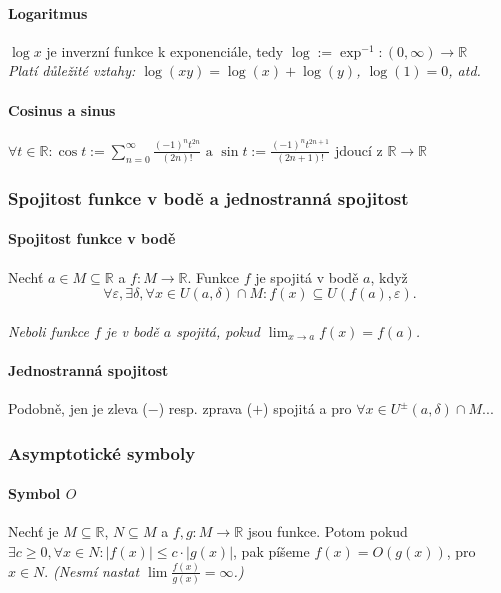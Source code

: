 \documentclass[10pt,a4paper]{article}
\newcommand{\R}{{\mathbb{R}}}
\begin{document}
\paragraph*{Logaritmus} $\log x$ je inverzní funkce k exponenciále, tedy $\log := \exp^{-1}:(0, \infty) \to \R$\\
\textit{Platí důležité vztahy: $\log(xy) = \log(x)+\log(y)$, $\log(1) = 0$, atd.}

\paragraph*{Cosinus a sinus} \(\displaystyle
    \forall t \in \R : \cos t := \sum_{n=0}^{\infty} \frac{(-1)^nt^{2n}}{(2n)!} \text{ a } \sin t := \frac{(-1)^nt^{2n+1}}{(2n+1)!} \text{ jdoucí z } \R \to \R
\)

\subsubsection{Spojitost funkce v bodě a jednostranná spojitost}
\paragraph*{Spojitost funkce v bodě} Nechť $a\in M \subseteq \R$ a $f: M \to \R$. Funkce $f$ je spojitá v bodě $a$, když 
\[
    \forall \varepsilon, \exists \delta, \forall x \in U(a, \delta) \cap M: f(x) \subseteq U(f(a), \varepsilon).
\]
\\ \textit{Neboli funkce $f$ je v bodě $a$ spojitá, pokud $\lim_{x\to a} f(x) = f(a)$.}
\paragraph*{Jednostranná spojitost} Podobně, jen je zleva ($-$) resp. zprava ($+$) spojitá a pro $\forall x \in U^{\pm}(a, \delta) \cap M...$

\subsubsection{Asymptotické symboly}

\paragraph*{Symbol $O$} Nechť je $M \subseteq \R$, $N\subseteq M$ a $f,g: M \to \R$ jsou funkce. 
Potom pokud $\exists c \geq 0, \forall x \in N: |f(x)| \leq c \cdot |g(x)|$, pak píšeme $f(x) = O(g(x))$, pro $x \in N$.
\textit{(Nesmí nastat $\lim \frac{f(x)}{g(x)} = \infty$.)}
\end{document}
